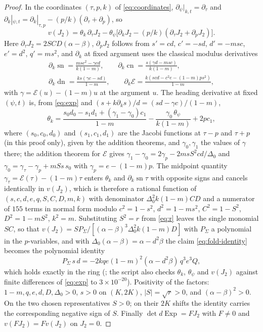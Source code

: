 \documentclass[11pt]{article}
\theoremstyle{remark}
\newcommand{\sn}{\operatorname{sn}}
\newcommand{\cn}{\operatorname{cn}}
\newcommand{\dn}{\operatorname{dn}}
\newcommand{\epsi}{\mathcal{E}}
\newcommand{\Exp}{\operatorname{Exp}}
\begin{document}
\begin{proof}
In the coordinates $(\tau,p,k)$ of \eqref{eq:coordinates},
$\partial_\psi|_{k,t}=\partial_\tau$ and
$\partial_k|_{\psi,t}=\partial_k|_{\tau,p}-(p/k)(\partial_\tau+\partial_p)$,
so
\[
 v(J_2)=\theta_k\,\partial_\tau J_2
 -\theta_\psi\bigl[\partial_kJ_2-(p/k)(\partial_\tau J_2+\partial_pJ_2)\bigr].
\]
Here $\partial_\tau J_2=2SCD(\alpha-\beta)$, $\partial_pJ_2$ follows from
$s'=cd$, $c'=-sd$, $d'=-msc$, $e'=d^2$, $q'=ms^2$, and $\partial_k$ at fixed
argument uses the classical modulus derivatives
\begin{gather*}
 \partial_k\sn=\frac{ms c^2-\gamma cd}{k(1-m)},\qquad
 \partial_k\cn=\frac{s(\gamma d-msc)}{k(1-m)},\\
 \partial_k\dn=\frac{ks(\gamma c-sd)}{1-m},\qquad
 \partial_k\epsi=\frac{k(scd-c^2e-(1-m)ps^2)}{1-m},
\end{gather*}
with $\gamma=\epsi(u)-(1-m)u$ at the argument $u$.  The heading derivative
at fixed $(\psi,t)$ is, from \eqref{eq:exp} and $(s+k\partial_ks)/d=(sd-\gamma c)/(1-m)$,
\begin{equation}\label{eq:theta-k}
 \theta_k=\frac{s_0d_0-s_1d_1+(\gamma_1-\gamma_0)c_1}{1-m}
 -\frac{\gamma_0\,\theta_\psi}{k(1-m)}+2pc_1,
\end{equation}
where $(s_0,c_0,d_0)$ and $(s_1,c_1,d_1)$ are the Jacobi functions at
$\tau-p$ and $\tau+p$ (in this proof only), given by the addition theorems, and $\gamma_0,\gamma_1$
the values of $\gamma$ there; the addition theorem for $\epsi$ gives
$\gamma_1-\gamma_0=2\gamma_p-2msS^2cd/\Delta_0$ and
$\gamma_0=\gamma_\tau-\gamma_p+mSs\,s_0$ with $\gamma_p=e-(1-m)p$.  The
midpoint quantity $\gamma_\tau=\epsi(\tau)-(1-m)\tau$ enters $\theta_k$
and $\partial_k\sn\tau$ with opposite signs and cancels identically in
$v(J_2)$, which is therefore a rational function of
$(s,c,d,e,q,S,C,D,m,k)$ with denominator $\Delta_0^2k(1-m)CD$ and a
numerator of $155$ terms in normal form modulo $c^2=1-s^2$, $d^2=1-ms^2$,
$C^2=1-S^2$, $D^2=1-mS^2$, $k^2=m$.  Substituting $S^2=r$ from \eqref{eq:r}
leaves the single monomial $SC$, so that
$v(J_2)=SP_\Sigma/[(\alpha-\beta)^3\Delta_0^2k(1-m)D]$ with $P_\Sigma$ a
polynomial in the $p$-variables, and with
$\Delta_0(\alpha-\beta)=\alpha-d^2\beta$ the claim \eqref{eq:fold-identity}
becomes the polynomial identity
\[
 P_\Sigma\,s\,d=-2kqe(1-m)^2(\alpha-d^2\beta)\,q^3e^3Q,
\]
which holds exactly in the ring
(; the script also checks
$\theta_k$, $\theta_\psi$ and $v(J_2)$ against finite differences of
\eqref{eq:exp} to $3\times10^{-20}$).  Positivity of the factors:
$1-m,q,e,d,D,\Delta_0>0$, $s>0$ on $(K,2K)$,
$|S|=\sqrt r>0$, and $(\alpha-\beta)^2>0$.  On the two chosen
representatives $S>0$; on their $2K$ shifts the identity carries the
corresponding negative sign of $S$.  Finally $\det d\Exp=FJ_2$ with $F\ne0$ and
$v(FJ_2)=Fv(J_2)$ on $J_2=0$.
\end{proof}
\end{document}
